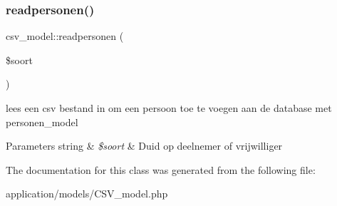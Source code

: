 \subsubsection{\texorpdfstring{readpersonen()}{readpersonen()}}
{\footnotesize\ttfamily csv\+\_\+model\+::readpersonen (\begin{DoxyParamCaption}\item[{}]{\$soort }\end{DoxyParamCaption})}

lees een csv bestand in om een persoon toe te voegen aan de database met personen\+\_\+model 
\begin{DoxyParams}[1]{Parameters}
string & {\em \$soort} & Duid op deelnemer of vrijwilliger \\
\hline
\end{DoxyParams}


The documentation for this class was generated from the following file\+:\begin{DoxyCompactItemize}
\item 
application/models/C\+S\+V\+\_\+model.\+php\end{DoxyCompactItemize}
